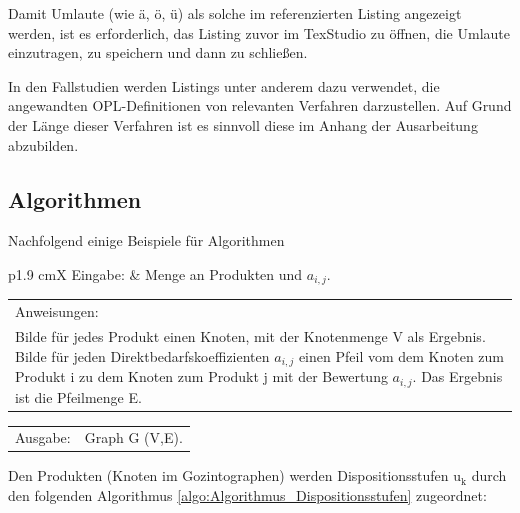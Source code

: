 		Damit Umlaute (wie ä, ö, ü) als solche im referenzierten Listing angezeigt werden, ist es erforderlich, das Listing zuvor im TexStudio zu öffnen, die Umlaute einzutragen, zu speichern und dann zu schließen.	
		
		
		In den Fallstudien werden Listings unter anderem dazu verwendet, die angewandten OPL-Definitionen von relevanten Verfahren darzustellen. Auf Grund der Länge dieser Verfahren ist es sinnvoll diese im Anhang der Ausarbeitung abzubilden.

\subsection{Algorithmen}
Nachfolgend einige Beispiele für Algorithmen \\


\begin{algorithmic}
    \label{algo:Algorithmus_Gozintograph}
    \STATE
    \begin{tabularx}{\linewidth}{p{1.9 cm}X}
        \hspace*{1 mm} Eingabe: &  Menge an Produkten und $a_{i,j}$.
    \end{tabularx}
    \addtocounter{table}{-1} %
    \begin{tabularx}{\linewidth}{X}
    Anweisungen: \\
    Bilde für jedes Produkt einen Knoten, mit der Knotenmenge V als Ergebnis. Bilde für jeden Direktbedarfskoeffizienten $a_{i,j}$ einen Pfeil vom dem Knoten zum Produkt i zu dem Knoten zum Produkt j mit der Bewertung $a_{i,j}$. Das Ergebnis ist die Pfeilmenge E.
    \end{tabularx}
    \begin{tabularx}{\linewidth}{p{1.9 cm}X}
        \hspace*{1 mm} Ausgabe: & Graph G (V,E).
    \end{tabularx}
    \addtocounter{table}{-1} %
\end{algorithmic}

Den Produkten (Knoten im Gozintographen) werden Dispositionsstufen $\mathrm{u_{k}}$ durch den folgenden Algorithmus \ref{algo:Algorithmus_Dispositionsstufen} zugeordnet: \\

